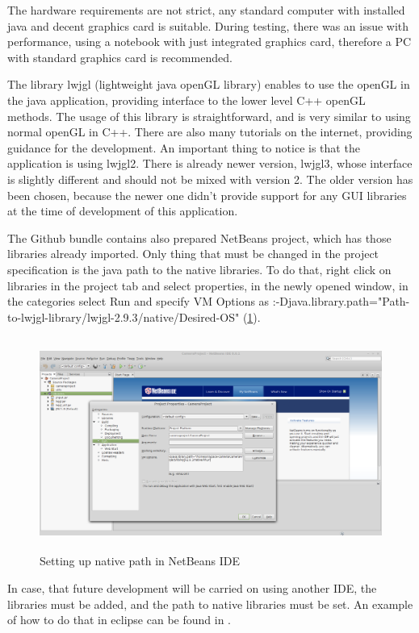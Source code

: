 \documentclass[english,12pt,a4paper,pdftex,elec,utf8]{aaltothesis}
\begin{document}
The hardware requirements are not strict, any standard computer with installed java and decent graphics card is suitable. During testing, there was an issue with performance, using a notebook with just integrated graphics card, therefore a PC with standard graphics card is recommended. 

The library lwjgl (lightweight java openGL library) enables to use the openGL in the java application, providing interface to the lower level C++ openGL methods. The usage of this library is straightforward, and is very similar to using normal openGL in C++. There are also many tutorials on the internet, providing guidance for the development. An important thing to notice is that the application is using lwjgl2. There is already newer version, lwjgl3, whose interface is slightly different and should not be mixed with version 2. The older version has been chosen, because the newer one didn't provide support for any GUI libraries at the time of development of this application.

The Github bundle contains also prepared NetBeans project, which has those libraries already imported. Only thing that must be changed in the project specification is the java path to the native libraries. To do that, right click on libraries in the project tab and select properties, in the newly opened window, in the categories select Run and specify VM Options as :-Djava.library.path="Path-to-lwjgl-library/lwjgl-2.9.3/native/Desired-OS" (\ref{setUpPaths}).

\begin{figure}[htb]
\centering \includegraphics[height=7cm]{SetUpPaths.png}
\caption{Setting up native path in NetBeans IDE\label{setUpPaths}}
\end{figure}

In case, that future development will be carried on using another IDE, the libraries must be added, and the path to native libraries must be set. An example of how to do that in eclipse can be found in \cite{eclipse}.
\end{document}
